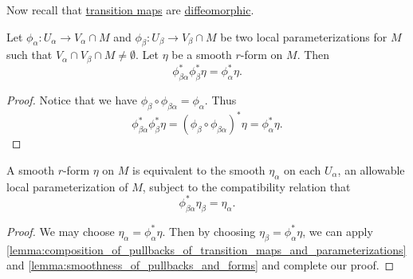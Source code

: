 \documentclass[notoc,notitlepage]{tufte-book}
\begin{document}
Now recall that \hyperref[defn:transition_map]{transition maps} are
\hyperref[propo:transition_maps_are_diffeomorphisms]{diffeomorphic}.

\begin{lemma}\label{lemma:composition_of_pullbacks_of_transition_maps_and_parameterizations}
  Let $\phi_\alpha : U_\alpha \to V_\alpha \cap M$ and $\phi_\beta : U_\beta \to
  V_\beta \cap M$ be two local parameterizations for $M$ such that $V_\alpha \cap
  V_\beta \cap M \neq \emptyset$. Let $\eta$ be a smooth $r$-form on $M$. Then
  \begin{equation}\label{eq:composition_of_pullbacks_of_transition_maps_and_parameterizations}
    \phi^*_{\beta \alpha} \phi_\beta^* \eta = \phi_\alpha^* \eta.
  \end{equation}
\end{lemma}

\begin{proof}
  Notice that we have $\phi_\beta \circ \phi_{\beta \alpha} = \phi_\alpha$. Thus
  \begin{equation*}
    \phi^*_{\beta \alpha} \phi_\beta^* \eta = \left( \phi_\beta \circ
    \phi_{\beta \alpha} \right)^* \eta = \phi_\alpha^* \eta.
  \end{equation*}
\end{proof}

\begin{crly}\label{crly:_r_forms_on_a_submanifold_and_its_parameterizations_are_equivalent}
  A smooth $r$-form $\eta$ on $M$ is equivalent to the smooth $\eta_\alpha$ on
  each $U_\alpha$, an allowable local parameterization of $M$, subject to the
  compatibility relation that
  \begin{equation*}
    \phi_{\beta\alpha}^* \eta_\beta = \eta_\alpha.
  \end{equation*}
\end{crly}

\begin{proof}
  We may choose $\eta_\alpha = \phi_\alpha^* \eta$. Then by choosing $\eta_\beta
  = \phi_\alpha^* \eta$, we can apply
  \cref{lemma:composition_of_pullbacks_of_transition_maps_and_parameterizations}
  and \cref{lemma:smoothness_of_pullbacks_and_forms} and complete our proof.
\end{proof}
\end{document}
